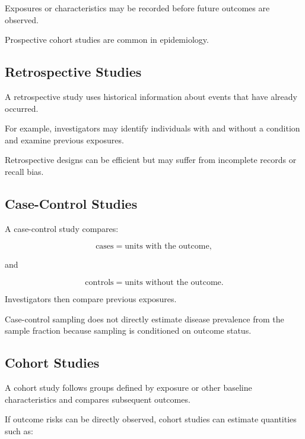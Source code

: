 Exposures or characteristics may be recorded before future outcomes are
observed.

Prospective cohort studies are common in epidemiology.

\subsection{Retrospective Studies}
\label{subsec:retrospective-studies}

A retrospective study uses historical information about events that have
already occurred.

For example, investigators may identify individuals with and without a
condition and examine previous exposures.

Retrospective designs can be efficient but may suffer from incomplete
records or recall bias.

\subsection{Case-Control Studies}
\label{subsec:case-control-studies}

A case-control study compares:

\[
\boxed{
\text{cases}
=
\text{units with the outcome},
}
\]

and

\[
\boxed{
\text{controls}
=
\text{units without the outcome}.
}
\]

Investigators then compare previous exposures.

Case-control sampling does not directly estimate disease prevalence from
the sample fraction because sampling is conditioned on outcome status.

\subsection{Cohort Studies}
\label{subsec:cohort-studies}

A cohort study follows groups defined by exposure or other baseline
characteristics and compares subsequent outcomes.

If outcome risks can be directly observed, cohort studies can estimate
quantities such as:

